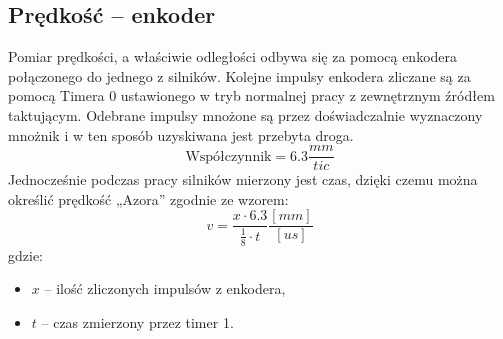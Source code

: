     \subsection{Prędkość -- enkoder}\label{section:measure:enkoder}
        \tab Pomiar prędkości, a właściwie odległości odbywa się za pomocą enkodera połączonego do jednego z silników.
        Kolejne impulsy enkodera zliczane są za pomocą Timera 0 ustawionego w tryb normalnej pracy z zewnętrznym źródłem taktującym.  %
        Odebrane impulsy mnożone są przez doświadczalnie wyznaczony mnożnik i w ten sposób uzyskiwana jest przebyta droga.
        \begin{equation}
            \text{Współczynnik} = 6.3 \frac{mm}{tic}
        \end{equation}
        Jednocześnie podczas pracy silników mierzony jest czas, dzięki czemu można określić prędkość „Azora” zgodnie ze wzorem:
        \begin{equation}
            v = \frac{x\cdot 6.3}{\frac{1}{8}\cdot t}\frac{[mm]}{[us]}
        \end{equation}
        gdzie:
        \begin{itemize}
            \item $x$ -- ilość zliczonych impulsów z enkodera,
            \item $t$ -- czas zmierzony przez timer 1.
        \end{itemize}
        
